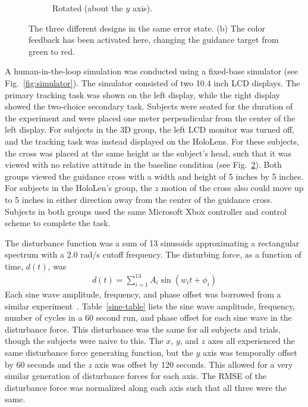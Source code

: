 \begin{figure}[t!]
\begin{center}
\begin{subfigure}{0.32\textwidth}
            \caption[Rotated (about the $y$ axis)]{Rotated (about the $y$ axis).}
            \label{fig:designs_rotated}
        \end{subfigure}
        \caption[The three different designs in the same error state]{The three different designs in the same error state.
            (b) The color feedback has been activated here, changing the guidance target from green to red.}
        \label{fig:designs}%
    \end{center}
\end{figure}

A human-in-the-loop simulation was conducted using a fixed-base simulator (see Fig.~\ref{fig:simulator}).
The simulator consisted of two 10.4 inch LCD displays.
The primary tracking task was shown on the left display, while the right display showed the two-choice secondary task.
Subjects were seated for the duration of the experiment and were placed one meter perpendicular from the center of the left display.
For subjects in the 3D group, the left LCD monitor was turned off, and the tracking task was instead displayed on the HoloLens.
For these subjects, the cross was placed at the same height as the subject's head, such that it was viewed with no relative attitude in the baseline condition (see Fig.~\ref{fig:designs}).
Both groups viewed the guidance cross with a width and height of 5 inches by 5 inches.
For subjects in the HoloLen's group, the $z$ motion of the cross also could move up to 5 inches in either direction away from the center of the guidance cross.
Subjects in both groups used the same Microsoft Xbox controller and control scheme to complete the task.

The disturbance function was a sum of 13 sinusoids approximating a rectangular spectrum with a 2.0 rad/s cutoff frequency.
The disturbing force, as a function of time, $d(t)$, was
\begin{align}
    d(t) = \sum_{i=1}^{13} A_i \sin \left( w_i t + \phi_i \right)
    \label{eq:disturbance}
\end{align}
Each sine wave amplitude, frequency, and phase offset was borrowed from a similar experiment~\citep{hess_effects_1984}.
Table~\ref{sine-table} lists the sine wave amplitude, frequency, number of cycles in a 60 second run, and phase offset for each sine wave in the disturbance force.
This disturbance was the same for all subjects and trials, though the subjects were naive to this.
The $x$, $y$, and $z$ axes all experienced the same disturbance force generating function, but the $y$ axis was temporally offset by 60 seconds and the $z$ axis was offset by 120 seconds.
This allowed for a very similar generation of disturbance forces for each axis.
The RMSE of the disturbance force was normalized along each axis such that all three were the same.

